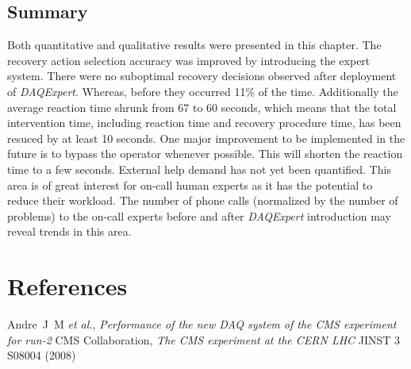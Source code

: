 \documentclass[a4paper]{jpconf}
\begin{document}
\subsection{Summary}
Both quantitative and qualitative results were presented in this chapter. The recovery action selection accuracy was improved by introducing the expert system. There were no suboptimal recovery decisions observed after deployment of {\it DAQExpert}. Whereas, before they occurred 11\% of the time. Additionally the average reaction time shrunk from 67 to 60 seconds, which means that the total intervention time, including reaction time and recovery procedure time, has been resuced by at least 10 seconds. One major improvement to be implemented in the future is to bypass the operator whenever possible. This will shorten the reaction time to a few seconds.
External help demand has not yet been quantified. This area is of great interest for on-call human experts as it has the potential to reduce their workload. The number of phone calls (normalized by the number of problems) to the on-call experts before and after {\it DAQExpert} introduction may reveal trends in this area.


\section*{References}
\begin{thebibliography}{9}
 Andre~J~M {\it et al.}, {\it Performance of the new DAQ system of the CMS experiment for run-2}
 CMS Collaboration, {\it The CMS experiment at the CERN LHC} JINST 3 S08004 (2008)
\end{thebibliography}
\end{document}
